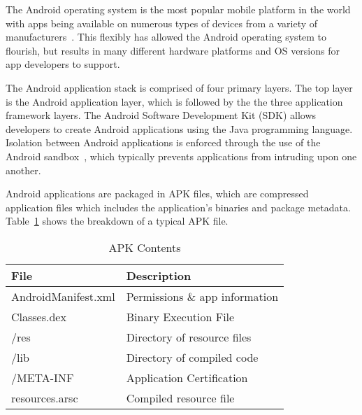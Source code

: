 The Android operating system is the most popular mobile platform in the world with apps being available on numerous types of devices from a variety of manufacturers~\cite{androidpopularity_url}. This flexibly has allowed the Android operating system to flourish, but results in many different hardware platforms and OS versions for app developers to support.


The Android application stack is comprised of four primary layers. The top layer is the Android application layer, which is followed by the the three application framework layers. The Android Software Development Kit (SDK) allows developers to create Android applications using the Java programming language. Isolation between Android applications is enforced through the use of the Android sandbox~\cite{androidsecuritytips_url}, which typically prevents applications from intruding upon one another.


Android applications are packaged in APK files, which are compressed application files which includes the application's binaries and package metadata. Table~\ref{Table:apkcontents} shows the breakdown of a typical APK file.



\begin{table}[ht]%
\begin{center}
\caption{APK Contents}
\label{Table:apkcontents}
  \begin{tabular}{| l | l | } \hline

    \bfseries File & \bfseries Description \\ \hline
    AndroidManifest.xml & Permissions \& app information \\ \hline
    Classes.dex & Binary Execution File \\ \hline
    /res & Directory of resource files \\ \hline
    /lib & Directory of compiled code \\ \hline
    /META-INF & Application Certification \\ \hline
    resources.arsc & Compiled resource file \\ \hline
  \end{tabular}
  \end{center}
\end{table}


